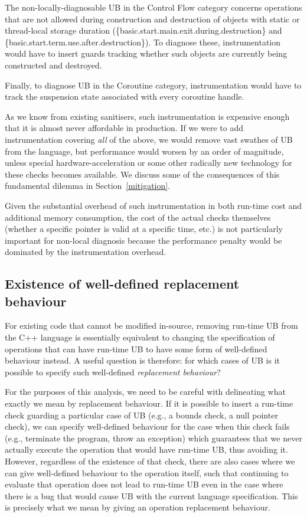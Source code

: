The non-locally-diagnosable UB in the Control Flow category concerns operations that are not allowed during construction and destruction of objects with static or thread-local storage duration (\{basic.start.main.exit.during.destruction\} and \{basic.start.term.use.after.destruction\}). To diagnose these, instrumentation would have to insert guards tracking whether such objects are currently being constructed and destroyed.  

Finally, to diagnose UB in the Coroutine category, instrumentation would have to track the suspension state associated with every coroutine handle.

As we know from existing sanitisers, such instrumentation is expensive enough that it is almost never affordable in production. If we were to add instrumentation covering \emph{all} of the above, we would remove vast swathes of UB from the language, but performance would worsen by an order of magnitude, unless special hardware-acceleration or some other radically new technology for these checks becomes available. We discuss some of the consequences of this fundamental dilemma in Section~\ref{mitigation}.

Given the substantial overhead of such instrumentation in both run-time cost and additional memory consumption, the cost of the actual checks themselves (whether a specific pointer is valid at a specific time, etc.) is not particularly important for non-local diagnosis because the performance penalty would be dominated by the instrumentation overhead.

\subsection{Existence of well-defined replacement behaviour}
\label{fallback}

For existing code that cannot be modified in-source, removing run-time UB from the C++ language is essentially equivalent to changing the specification of operations that can have run-time UB to have some form of well-defined behaviour instead. A useful question is therefore: for which cases of UB is it possible to specify such well-defined \emph{replacement behaviour}?

For the purposes of this analysis, we need to be careful with delineating what exactly we mean by replacement behaviour. If it is possible to insert a run-time check guarding a particular case of UB (e.g., a bounds check, a null pointer check), we can specify well-defined behaviour for the case when this check fails (e.g., terminate the program, throw an exception) which guarantees that we never actually execute the operation that would have run-time UB, thus avoiding it. However, regardless of the existence of that check, there are also cases where we can give well-defined behaviour to the operation itself, such that continuing to evaluate that operation does not lead to run-time UB even in the case where there is a bug that would cause UB with the current language specification. This is precisely what we mean by giving an operation replacement behaviour.


